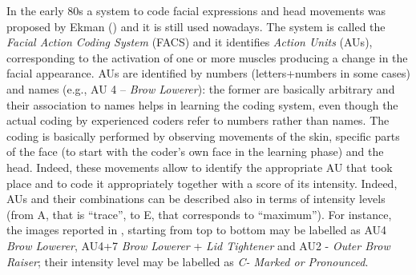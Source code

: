 \documentclass[output=paper]{langsci/langscibook}
\begin{document}
In the early 80s a system to code facial expressions and head movements was proposed by Ekman (\citealt{Ekman1978,Ekman2002}) and it is still used nowadays. The system is called the \textit{Facial Action Coding System} (FACS) and it identifies \textit{Action Units} (AUs), corresponding to the activation of one or more muscles producing a change in the facial appearance. AUs are identified by numbers (letters+numbers in some cases) and names (e.g., AU 4 – \textit{Brow Lowerer}): the former are basically arbitrary and their association to names helps in learning the coding system, even though the actual coding by experienced coders refer to numbers rather than names. The coding is basically performed by observing movements of the skin, specific parts of the face (to start with the coder’s own face in the learning phase) and the head. Indeed, these movements allow to identify the appropriate AU that took place and to code it appropriately together with a score of its intensity. Indeed,  AUs and their combinations can be described also in terms of intensity levels (from A, that is “trace”, to E, that corresponds to “maximum”). For instance, the images reported in , starting from top to bottom may be labelled as AU4 \textit{Brow Lowerer}, AU4+7 \textit{Brow Lowerer} + \textit{Lid Tightener} and AU2 - \textit{Outer Brow Raiser}; their intensity level may be labelled as \textit{C- Marked or Pronounced}.

 
\end{document}

